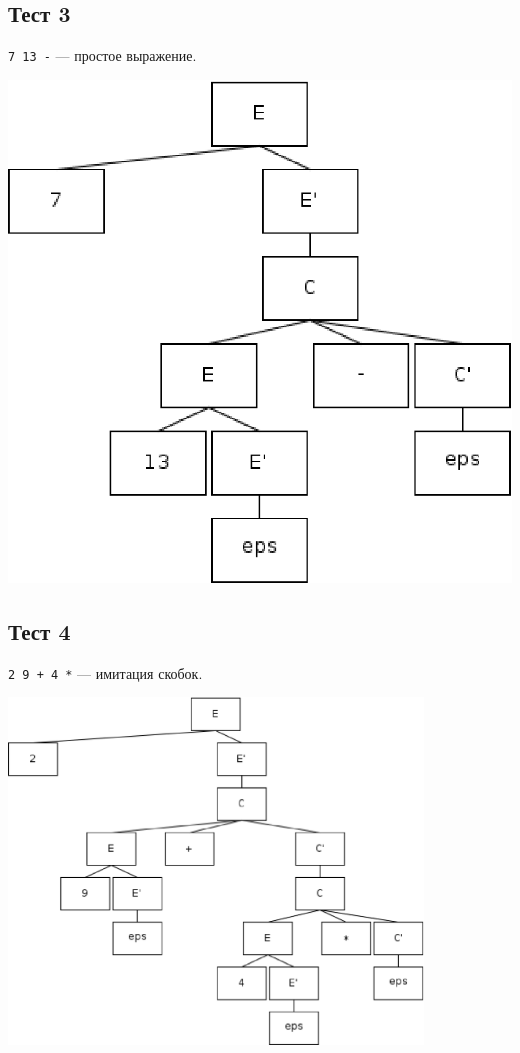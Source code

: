 \subsection{Тест 3}

\texttt{7 13 -} --- простое выражение.

\includegraphics{test3.eps} 

\subsection{Тест 4}

\texttt{2 9 + 4 *} --- имитация скобок.

\includegraphics[width=110mm]{test4.eps} 

